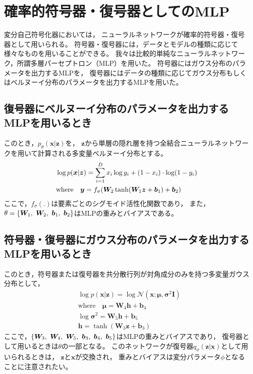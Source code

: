 \documentclass[dvipdfmx, fleqn, draft]{jsarticle}
\begin{document}
\section{確率的符号器・復号器としてのMLP}

変分自己符号化器においては，
ニューラルネットワークが確率的符号器・復号器として用いられる。
符号器・復号器には，データとモデルの種類に応じて様々なものを用いることができる。
我々は比較的単純なニューラルネットワーク，所謂多層パーセプトロン（MLP）を用いた。
符号器にはガウス分布のパラメータを出力するMLPを，
復号器にはデータの種類に応じてガウス分布もしくはベルヌーイ分布のパラメータを出力するMLPを用いた。

\subsection{復号器にベルヌーイ分布のパラメータを出力するMLPを用いるとき}

このとき，\(p_{\theta} (\bm{x} | \bm{z})\)を，
\(\bm{z}\)から単層の隠れ層を持つ全結合ニューラルネットワークを用いて計算される多変量ベルヌーイ分布とする。
\begin{equation}
    \begin{split}
        & \log{p(\bm{x} | \bm{z})} = \sum_{i=1}^{D} x_i \log{y_i} + (1 - x_i) \cdot \log(1 - y_i) \\
        & \text{where} \quad
            \bm{y} = f_{\sigma} \qty(\bm{W}_2 \tanh(\bm{W}_1 \bm{z} + \bm{b}_1) + \bm{b}_2)
    \end{split}
\end{equation}
ここで，\(f_{\sigma} (.)\)は要素ごとのシグモイド活性化関数であり，
また，\(\theta = \qty{\bm{W}_1,\ \bm{W}_2,\ \bm{b}_1,\ \bm{b}_2}\)はMLPの重みとバイアスである。


\subsection{符号器・復号器にガウス分布のパラメータを出力するMLPを用いるとき}

このとき，符号器または復号器を共分散行列が対角成分のみを持つ多変量ガウス分布として，
\begin{equation}
    \begin{split}
        & \log{p(\bm{x} | \bm{z})} = \log{\mathcal{N}(\bm{x}; \bm{\mu}, \bm{\sigma}^2 \bm{I})} \\
        & \text{where} \quad \bm{\mu} = \bm{W}_4 \bm{h} + \bm{b}_4 \\
        & \log{\bm{\sigma}^2} = \bm{W}_5  \bm{h} + \bm{b}_5 \\
        & \bm{h} = \tanh(\bm{W}_3 \bm{z} + \bm{b}_3)
    \end{split}
\end{equation}
ここで，\(\qty{\bm{W}_3,\ \bm{W}_4,\ \bm{W}_5,\ \bm{b}_3,\ \bm{b}_4,\ \bm{b}_5}\)はMLPの重みとバイアスであり，
復号器として用いるときは\(\theta\)の一部となる。
このネットワークが復号器\(q_{\phi} (\bm{z} | \bm{x})\)として用いられるときは，
\(\bm{z}\)と\(\bm{x}\)が交換され，
重みとバイアスは変分パラメータ\(\phi\)となることに注意されたい。
\end{document}
